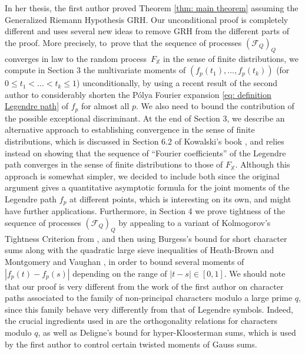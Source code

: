\documentclass[10pt]{amsart}
\theoremstyle{plain}
\theoremstyle{definition}
\newcommand{\X}{\mathbb{X}}
\begin{document}
In her thesis, the first author proved Theorem \ref{thm: main theorem} assuming the Generalized Riemann Hypothesis GRH. Our unconditional proof is completely different and uses several new ideas to remove GRH
from the different parts of the proof. More precisely, to~prove that the sequence of processes $(\mathcal{F}_Q)_Q$ converges in law to the random process~$F_{\X}$ in the sense of finite distributions, we compute in Section 3 the multivariate moments of $(f_{p}(t_1), \dots, f_p(t_k))$ (for $0\le t_1<\dots <t_k\leq 1$) unconditionally, by using a recent result of the second author \cite{La} to considerably shorten the Pólya Fourier expansion \eqref{eq: definition Legendre path} of $f_p$ for almost all $p$. We also need to bound the contribution of the possible exceptional discriminant.
At the end of Section 3, we describe an alternative approach to establishing convergence in the sense of finite distributions, which is discussed in Section 6.2 of Kowalski's book \cite{Ko}, and relies instead on showing that the sequence of ``Fourier coefficients'' of the Legendre path converges in the sense of finite distributions to those of $F_{\X}$. Although this approach is somewhat simpler, we decided to include both since the original argument gives a quantitative asymptotic formula for the joint moments of the Legendre path $f_p$ at different points, which is interesting on its own, and might have further applications. Furthermore, in Section 4 we prove tightness of the sequence of processes $(\mathcal{F}_Q)_Q$ by appealing to a variant of Kolmogorov's Tightness Criterion from \cite{Ko}, and then using Burgess's bound for short character sums along with the quadratic large sieve inequalities of Heath-Brown \cite{HB} and Montgomery and Vaughan \cite{MoVaBook}, in order to bound several moments of $|f_p(t)-f_p(s)|$ depending on the range of $|t-s| \in [0,1]$. We should note that our proof is very different from the work of the first author \cite{Hu} on character paths associated to the family of non-principal characters modulo a large prime $q$, since this family behave very differently from that of Legendre symbols. Indeed, the crucial ingredients used in \cite{Hu} are the orthogonality relations for characters modulo $q$, as well as Deligne's bound for hyper-Kloosterman sums, which is used by the first author to control certain twisted moments of Gauss sums.
\end{document}
